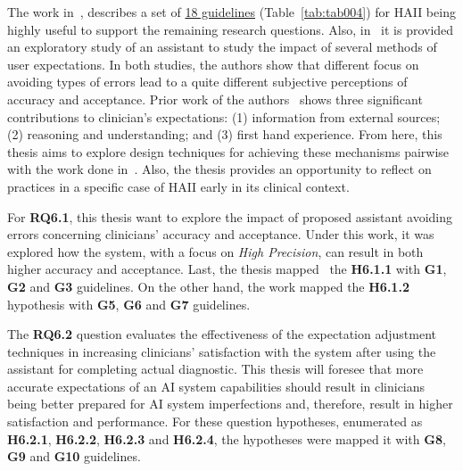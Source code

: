 \hfill

The work in~\cite{10.1145/3290605.3300233}, describes a set of \underline{18 guidelines} (Table~\ref{tab:tab004}) for \ac{HAII} being highly useful to support the remaining research questions.
Also, in~\cite{Kocielnik:2019:YAI:3290605.3300641} it is provided  an exploratory study of an assistant to study the impact of several methods of user expectations.
In both studies, the authors show that different focus on avoiding types of errors lead to a quite different subjective perceptions of accuracy and acceptance.
Prior work of the authors~\cite{Kocielnik:2019:YAI:3290605.3300641} shows three significant contributions to clinician's expectations:
(1) information from external sources;
(2) reasoning and understanding; and
(3) first hand experience.
From here, this thesis aims to explore design techniques for achieving these mechanisms pairwise with the work done in~\cite{10.1145/3290605.3300233}.
Also, the thesis provides an opportunity to reflect on practices in a specific case of \ac{HAII} early in its clinical context.



For {\bf RQ6.1}, this thesis want to explore the impact of proposed assistant avoiding errors concerning clinicians' accuracy and acceptance.
Under this work, it was explored how the system, with a focus on {\it High Precision}, can result in both higher accuracy and acceptance.
Last, the thesis mapped~\cite{10.1145/3290605.3300233} the {\bf H6.1.1} with {\bf G1}, {\bf G2} and {\bf G3} guidelines.
On the other hand, the work mapped the {\bf H6.1.2} hypothesis with {\bf G5}, {\bf G6} and {\bf G7} guidelines.

The {\bf RQ6.2} question evaluates the effectiveness of the expectation adjustment techniques in increasing clinicians' satisfaction with the system after using the assistant for completing actual diagnostic.
This thesis will foresee that more accurate expectations of an \ac{AI} system capabilities should result in clinicians being better prepared for \ac{AI} system imperfections and, therefore, result in higher satisfaction and performance.
For these question hypotheses, enumerated as {\bf H6.2.1}, {\bf H6.2.2}, {\bf H6.2.3} and {\bf H6.2.4}, the hypotheses were mapped it with {\bf G8}, {\bf G9} and {\bf G10} guidelines.

